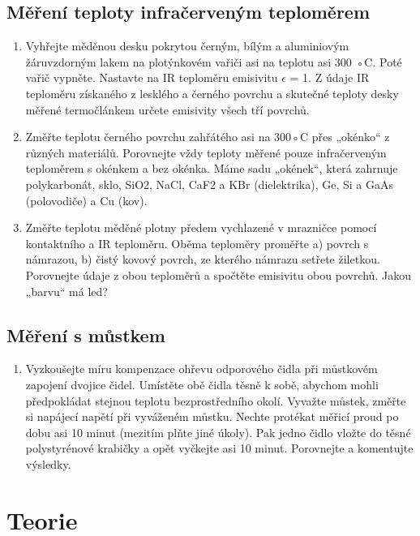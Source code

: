 \documentclass[a4paper,11pt]{article}
\begin{document}
\subsection{Měření teploty infračerveným teploměrem}

\begin{enumerate}
\item Vyhřejte měděnou desku pokrytou černým, bílým a aluminiovým žáruvzdorným lakem na
plotýnkovém vařiči asi na teplotu asi 300 ◦C. Poté vařič vypněte. Nastavte na IR teploměru
emisivitu $\epsilon$ = 1. Z údaje IR teploměru získaného z lesklého a černého povrchu a skutečné
teploty desky měřené termočlánkem určete emisivity všech tří povrchů. 
\item Změřte teplotu černého povrchu zahřátého asi na 300◦C přes „okénko“ z různých materiálů. Porovnejte vždy teploty měřené pouze
infračerveným teploměrem s okénkem a bez okénka. Máme sadu „okének“, která zahrnuje
polykarbonát, sklo, SiO2, NaCl, CaF2 a KBr (dielektrika), Ge, Si a GaAs (polovodiče) a
Cu (kov). 
\item Změřte teplotu měděné plotny předem vychlazené v mrazničce pomocí kontaktního a IR
teploměru. Oběma teploměry proměřte a) povrch s námrazou, b) čistý kovový povrch, ze
kterého námrazu setřete žiletkou. Porovnejte údaje z obou teploměrů a spočtěte emisivitu
obou povrchů. Jakou „barvu“ má led?

\end{enumerate}

\subsection{Měření s můstkem}

\begin{enumerate}
  \item Vyzkoušejte míru kompenzace ohřevu odporového čidla při můstkovém zapojení dvojice
čidel. Umístěte obě čidla těsně k sobě, abychom mohli předpokládat stejnou teplotu bezprostředního okolí. Vyvažte
můstek, změřte si napájecí napětí při vyváženém můstku. Nechte protékat měřicí proud po
dobu asi 10 minut (mezitím plňte jiné úkoly). Pak jedno čidlo vložte do těsné polystyrénové
krabičky a opět vyčkejte asi 10 minut. Porovnejte a komentujte výsledky.
 
\end{enumerate}

\section{Teorie}
\end{document}
